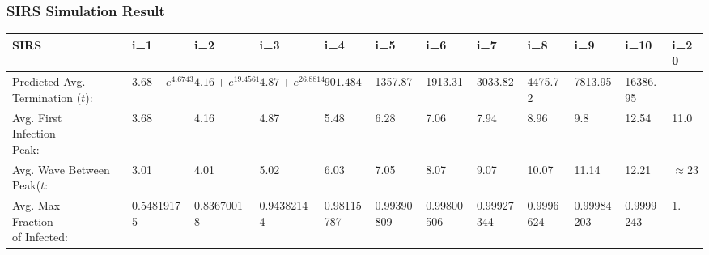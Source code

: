 \documentclass{subfile}
\begin{document}
  \subsubsection{SIRS Simulation Result}
  \begin{adjustbox}{max width=1.2\textwidth,center}
    \begin{tabular}{|l|l|l|l|l|l|l|l|l|l|l|l|}
      \hline
      SIRS & i=1 & i=2 & i=3 & i=4 & i=5 & i=6 & i=7 & i=8 & i=9 & i=10 & i=20\\
      \hline
      \makecell{Predicted\\Avg.\\Termination\\(\(t\))}\footnotemark: & \(3.68 + e^{4.6743}\) & \(4.16 + e^{19.4561}\) & \(4.87 + e^{26.8814}\) & \(901.4842\) & 1357.87 & 1913.31 & 3033.82 & 4475.72 & 7813.95 & 16386.95 & -\footnotemark\\
      \hline
      \makecell{Avg. First\\Infection\\Peak:} & 3.68 & 4.16 & 4.87 & 5.48 & 6.28 & 7.06 & 7.94 & 8.96 & 9.8 & 12.54 & 11.0\footnotemark\\
      \hline
      \makecell{Avg. Wave\\Between Peak(\(t\):} & 3.01 & 4.01 & 5.02 & 6.03 & 7.05 & 8.07 & 9.07 & 10.07 & 11.14 & 12.21 & \(\approx 23\)\footnotemark\\
      \hline
      \makecell{Avg. Max\\Fraction\\of Infected:} & 0.54819175& 0.83670018& 0.94382144& 0.98115787& 0.99390809& 0.99800506& 0.99927344& 0.9996624&  0.99984203& 0.9999243&  1.\\
      \hline
    \end{tabular}
  \end{adjustbox}
\end{document}
